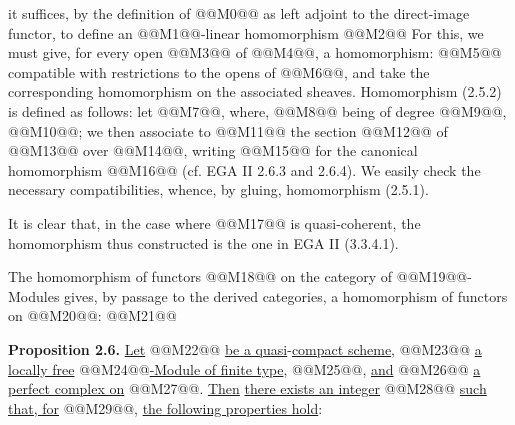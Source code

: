 it suffices, by the definition of @@M0@@ as left adjoint to the direct-image functor, to define an @@M1@@-linear homomorphism
@@M2@@
For this, we must give, for every open @@M3@@ of @@M4@@, a homomorphism:
@@M5@@
compatible with restrictions to the opens of @@M6@@, and take the corresponding homomorphism on the associated sheaves. Homomorphism (2.5.2) is defined as follows: let @@M7@@, where, @@M8@@ being of degree @@M9@@, @@M10@@; we then associate to @@M11@@ the section @@M12@@ of @@M13@@ over @@M14@@, writing @@M15@@ for the canonical homomorphism @@M16@@ (cf. EGA II 2.6.3 and 2.6.4). We easily check the necessary compatibilities, whence, by gluing, homomorphism (2.5.1).

It is clear that, in the case where @@M17@@ is quasi-coherent, the homomorphism thus constructed is the one in EGA II (3.3.4.1).

The homomorphism of functors @@M18@@ on the category of @@M19@@-Modules gives, by passage to the derived categories, a homomorphism of functors on @@M20@@:
@@M21@@

\textbf{Proposition 2.6.} \uline{Let} @@M22@@ \uline{be a quasi}-\uline{compact scheme}, @@M23@@ \uline{a locally free} @@M24@@\uline{-Module of finite type}, @@M25@@, \uline{and} @@M26@@ \uline{a perfect complex on} @@M27@@. \uline{Then} \uline{there exists an integer} @@M28@@ \uline{such that, for} @@M29@@, \uline{the following properties hold}:
